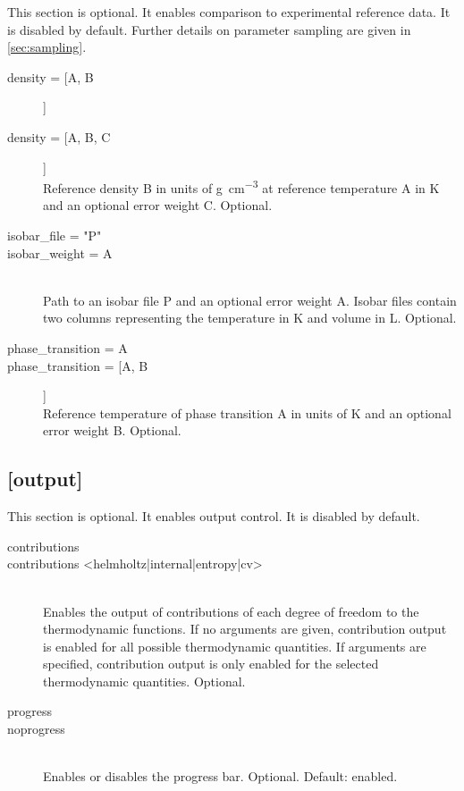 \documentclass{scrartcl}
\begin{document}
This section is optional.
It enables comparison to experimental reference data.
It is disabled by default.
Further details on parameter sampling are given in \cref{sec:sampling}.

\begin{description}
    \item[density = [A, B]]
    \item[density =  [A, B, C]] \hfill \\
        Reference density B in units of \si{\gram\per\cubic\centi\meter} at reference temperature 
        A in \si{\kelvin} and an optional error weight C.
        Optional.
        \vspace{0.1cm}
    \item[isobar\_file  = "P"]
    \item[isobar\_weight = A] \hfill \\
        Path to an isobar file P and an optional error weight A.
        Isobar files contain two columns representing the temperature in \si{\kelvin} and volume 
        in \si{\liter}.
        Optional.
        \vspace{0.1cm}
    \item[phase\_transition = A]
    \item[phase\_transition = [A, B]] \hfill \\
        Reference temperature of phase transition A in units of \si{\kelvin} and an optional error 
        weight B.
        Optional.
\end{description}

\subsection*{[output]}
\vspace{-0.3cm}

This section is optional.
It enables output control.
It is disabled by default.

\begin{description}
    \item[contributions]
    \item[contributions <helmholtz|internal|entropy|cv>] \hfill \\
        Enables the output of contributions of each degree of freedom to the thermodynamic functions.
        If no arguments are given, contribution output is enabled for all possible thermodynamic quantities.
        If arguments are specified, contribution output is only enabled for the selected thermodynamic quantities.
        Optional.
    \item[progress]
    \item[noprogress] \hfill \\
        Enables or disables the progress bar.
        Optional. Default: enabled.
\end{description}
\end{document}
